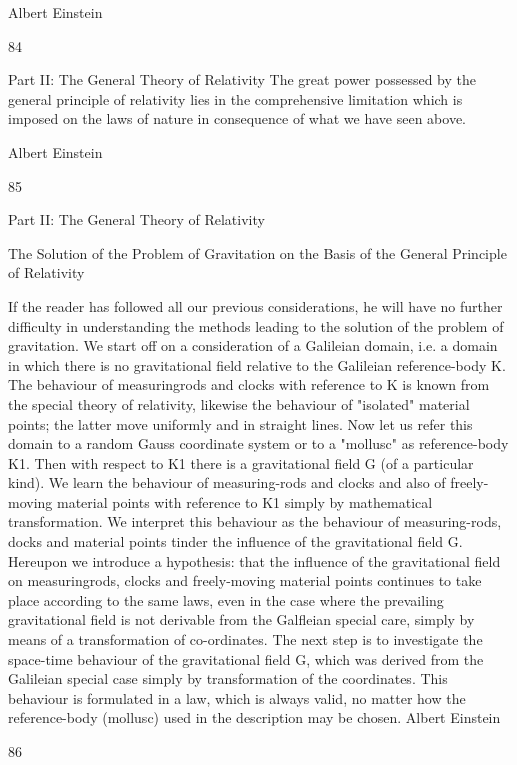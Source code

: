 \documentclass{article}
\begin{document}
Albert Einstein

84

Part II: The General Theory of Relativity
The great power possessed by the general principle of relativity lies in the comprehensive
limitation which is imposed on the laws of nature in consequence of what we have seen
above.

Albert Einstein

85

Part II: The General Theory of Relativity

The Solution of the Problem of
Gravitation on the Basis of the
General Principle of Relativity

If the reader has followed all our previous considerations, he will have no further
difficulty in understanding the methods leading to the solution of the problem of
gravitation.
We start off on a consideration of a Galileian domain, i.e. a domain in which there is no
gravitational field relative to the Galileian reference-body K. The behaviour of measuringrods and clocks with reference to K is known from the special theory of relativity, likewise
the behaviour of "isolated" material points; the latter move uniformly and in straight lines.
Now let us refer this domain to a random Gauss coordinate system or to a "mollusc" as
reference-body K1. Then with respect to K1 there is a gravitational field G (of a particular
kind). We learn the behaviour of measuring-rods and clocks and also of freely-moving
material points with reference to K1 simply by mathematical transformation. We interpret
this behaviour as the behaviour of measuring-rods, docks and material points tinder the
influence of the gravitational field G. Hereupon we introduce a hypothesis: that the
influence of the gravitational field on measuringrods, clocks and freely-moving material
points continues to take place according to the same laws, even in the case where the
prevailing gravitational field is not derivable from the Galfleian special care, simply by
means of a transformation of co-ordinates.
The next step is to investigate the space-time behaviour of the gravitational field G,
which was derived from the Galileian special case simply by transformation of the
coordinates. This behaviour is formulated in a law, which is always valid, no matter how
the reference-body (mollusc) used in the description may be chosen.
Albert Einstein

86
\end{document}
